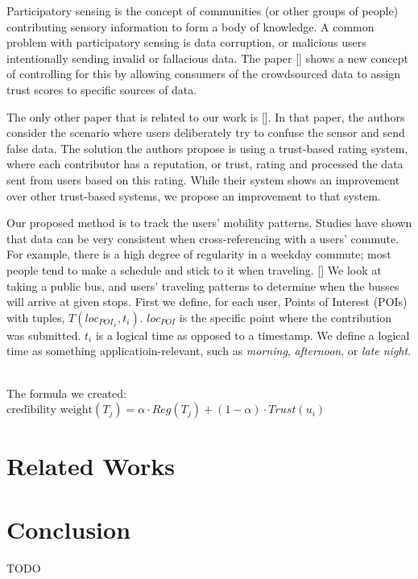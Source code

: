 \documentclass[12pt,twocolumn]{article}
\begin{document}
	    Participatory sensing is the concept of communities (or other groups of people) contributing sensory information to form a body of knowledge. %
	    A common problem with participatory sensing is data corruption, or malicious users intentionally sending invalid or fallacious data. The paper %
	    [] shows a new concept of controlling for this by allowing consumers of the crowdsourced data to assign trust scores to specific sources of data. 
	    
	    The only other paper that is related to our work is []. %
	    In that paper, the authors consider the scenario where users deliberately try to confuse the sensor and send false data. The solution the authors propose is using a trust-based rating system, where each contributor has a reputation, or trust, rating and processed the data sent from users based on this rating. While their system shows an improvement over other trust-based systems, we propose an improvement to that system.
	    
	    Our proposed method is to track the users' mobility patterns. Studies have shown that data can be very consistent when cross-referencing with a users' commute. For example, there is a high degree of regularity in a weekday commute; most people tend to make a schedule and stick to it when traveling. [] %
	    We look at taking a public bus, and users' traveling patterns to determine when the busses will arrive at given stops. First we define, for each user, Points of Interest (POIs) with tuples, $T(loc_{POI_x}, t_i)$. $loc_{POI}$ is the specific point where the contribution was submitted. $t_i$ is a logical time as opposed to a timestamp. We define a logical time as something applicatioin-relevant, such as \emph{morning}, \emph{afternoon}, or \emph{late night}.
	    
	    
	    
	    \\
	    The formula we created: 
	    $\text{credibility weight} (T_j) = \alpha \cdot Reg(T_j) + (1 - \alpha) \cdot Trust(u_i)$
	    
	    
	\section*{Related Works}
	    
	\section*{Conclusion}
	    TODO
	
	
\end{document}
